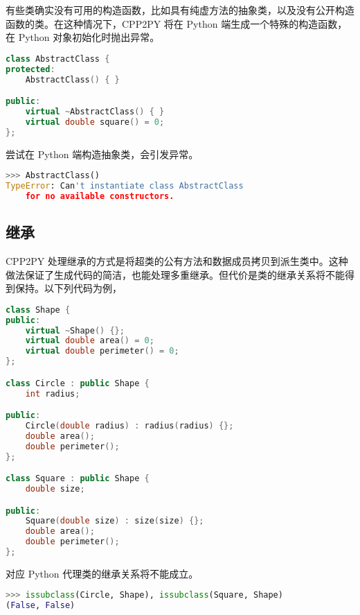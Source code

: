 有些类确实没有可用的构造函数，比如具有纯虚方法的抽象类，以及没有公开构造函数的类。在这种情况下，CPP2PY 将在 Python 端生成一个特殊的构造函数，在 Python 对象初始化时抛出异常。

\begin{framed}
\begin{lstlisting}[language=c++]
class AbstractClass {
protected:
    AbstractClass() { }

public:
    virtual ~AbstractClass() { }
    virtual double square() = 0;
};
\end{lstlisting}
\end{framed}

尝试在 Python 端构造抽象类，会引发异常。

\begin{framed}
\begin{lstlisting}[language=python]
>>> AbstractClass()
TypeError: Can't instantiate class AbstractClass 
    for no available constructors.
\end{lstlisting}
\end{framed}

\subsection{继承}

CPP2PY 处理继承的方式是将超类的公有方法和数据成员拷贝到派生类中。这种做法保证了生成代码的简洁，也能处理多重继承。但代价是类的继承关系将不能得到保持。以下列代码为例，


\begin{framed}
\begin{lstlisting}[language=c++]
class Shape {
public:
    virtual ~Shape() {};
    virtual double area() = 0;
    virtual double perimeter() = 0;
};

class Circle : public Shape {
    int radius;

public:
    Circle(double radius) : radius(radius) {};
    double area();
    double perimeter();
};

class Square : public Shape {
    double size;

public:
    Square(double size) : size(size) {};
    double area();
    double perimeter();
};

\end{lstlisting}
\end{framed}

对应 Python 代理类的继承关系将不能成立。

\begin{framed}
\begin{lstlisting}[language=python]
>>> issubclass(Circle, Shape), issubclass(Square, Shape)
(False, False)
\end{lstlisting}
\end{framed}

